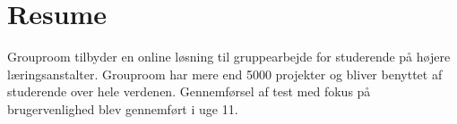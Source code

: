 \documentclass[12pt]{article}
\begin{document}

\clearpage\maketitle
\thispagestyle{empty}

\newpage
\section*{Resume}
Grouproom tilbyder en online løsning til gruppearbejde for studerende på højere læringsanstalter. Grouproom har mere end 5000 projekter og bliver benyttet af studerende over hele verdenen. Gennemførsel af test  med fokus på brugervenlighed blev gennemført i uge 11.\\
\end{document}

